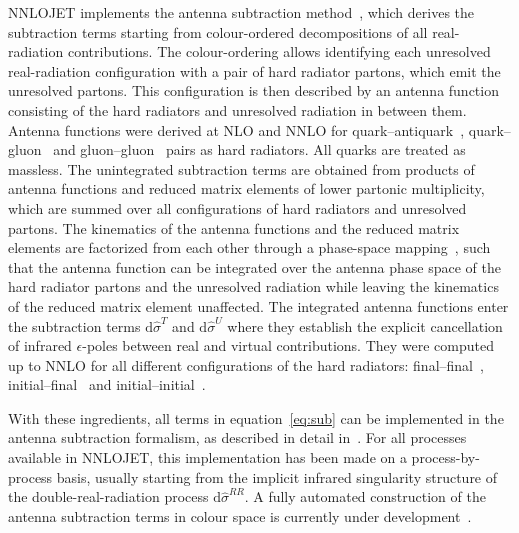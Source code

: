 \documentclass{SciPost}
\DeclareRobustCommand{\ensuremathrm}[1]{\ensuremath{\mathrm{#1}}}
\DeclareRobustCommand{\rd}{\ensuremathrm{d}}
\begin{document}
NNLOJET implements the antenna subtraction method~\cite{Gehrmann-DeRidder:2005btv,Daleo:2006xa,Currie:2013vh}, which derives the subtraction terms starting from
colour-ordered decompositions of all real-radiation contributions. The colour-ordering allows identifying each unresolved real-radiation configuration with a pair of hard radiator partons, which emit the unresolved partons. This configuration is then described by an antenna function consisting of the hard radiators and unresolved radiation in between them.
Antenna functions were derived at NLO and NNLO for quark--antiquark~\cite{Gehrmann-DeRidder:2004ttg},
quark--gluon~\cite{Gehrmann-DeRidder:2005svg} and gluon--gluon~\cite{Gehrmann-DeRidder:2005alt} pairs as hard radiators. All quarks are treated as massless.
The unintegrated subtraction
terms are obtained from products of antenna functions and reduced matrix elements of lower partonic multiplicity, which are summed over all
configurations of hard radiators and unresolved partons. The kinematics of the antenna functions and
the reduced matrix elements are factorized from each other through a phase-space mapping~\cite{Kosower:2002su,Daleo:2006xa}, such that the
antenna function can be integrated over the antenna phase space of the hard radiator partons and the unresolved radiation while leaving the
kinematics of the reduced matrix element unaffected.
The integrated antenna functions enter the subtraction terms $\rd\hat{\sigma}^{T}$ and $\rd\hat{\sigma}^{U}$ where they
establish the explicit cancellation of infrared $\epsilon$-poles between real and virtual contributions.
They were computed up to NNLO
for all different configurations of the hard radiators: final--final~\cite{Gehrmann-DeRidder:2005btv}, initial--final~\cite{Daleo:2009yj} and
initial--initial~\cite{Gehrmann:2011wi,Boughezal:2010mc,Gehrmann-DeRidder:2012too}.

With these ingredients, all terms in equation~\eqref{eq:sub} can be implemented in the antenna subtraction formalism, as
described in detail in~\cite{Currie:2013vh}. For all processes available in NNLOJET, this implementation has
been made on a process-by-process basis, usually starting from the implicit infrared singularity structure of the double-real-radiation process $\rd\hat{\sigma}^{RR}$.
A fully automated construction of the antenna subtraction terms in colour space is currently under development~\cite{Chen:2022ktf,Gehrmann:2023dxm}.


\end{document}
